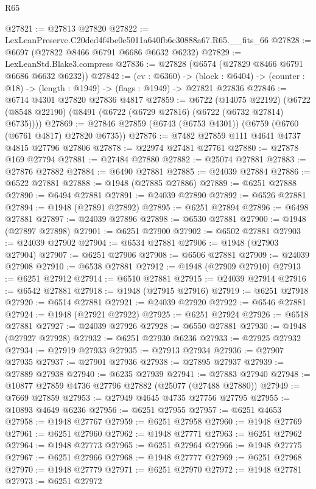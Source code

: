 \begin{lexlean}{R65}
\begin{coremodule}
{@27821 := @27813 @27820
@27822 := LexLeanPreserve.C20ded4f4be0e5011a640fb6c30888a67.R65.__fits_66
@27828 := @6697 (@27822 @8466 @6791 @6686 @6632 @6232)
@27829 := LexLeanStd.Blake3.compress
@27836 := @27828 (@6574 (@27829 @8466 @6791 @6686 @6632 @6232))
@27842 := (cv : @6360) ->
  (block : @6404) -> (counter : @18) -> (length : @1949) -> (flags : @1949) -> @27821 @27836
@27846 := @6714 @4301 @27820 @27836 @4817
@27859 := @6722
    (@14075 @22192)
    (@6722 (@8548 @22190) (@8491 (@6722 (@6729 @27816) (@6722 (@6732 @27814) @6735))))
@27869 := @27846 @27859 (@6743 (@6753 @4301)) (@6759 (@6760 (@6761 @4817) @27820 @6735))
@27876 := @7482 @27859 @111 @4641 @4737 @4815 @27796 @27806
@27878 := @22974 @27481 @27761
@27880 := @27878 @169 @27794
@27881 := @27484 @27880
@27882 := @25074 @27881
@27883 := @27876 @27882
@27884 := @6490 @27881
@27885 := @24039 @27884
@27886 := @6522 @27881
@27888 := @1948 (@27885 @27886)
@27889 := @6251 @27888
@27890 := @6494 @27881
@27891 := @24039 @27890
@27892 := @6526 @27881
@27894 := @1948 (@27891 @27892)
@27895 := @6251 @27894
@27896 := @6498 @27881
@27897 := @24039 @27896
@27898 := @6530 @27881
@27900 := @1948 (@27897 @27898)
@27901 := @6251 @27900
@27902 := @6502 @27881
@27903 := @24039 @27902
@27904 := @6534 @27881
@27906 := @1948 (@27903 @27904)
@27907 := @6251 @27906
@27908 := @6506 @27881
@27909 := @24039 @27908
@27910 := @6538 @27881
@27912 := @1948 (@27909 @27910)
@27913 := @6251 @27912
@27914 := @6510 @27881
@27915 := @24039 @27914
@27916 := @6542 @27881
@27918 := @1948 (@27915 @27916)
@27919 := @6251 @27918
@27920 := @6514 @27881
@27921 := @24039 @27920
@27922 := @6546 @27881
@27924 := @1948 (@27921 @27922)
@27925 := @6251 @27924
@27926 := @6518 @27881
@27927 := @24039 @27926
@27928 := @6550 @27881
@27930 := @1948 (@27927 @27928)
@27932 := @6251 @27930 @6236
@27933 := @27925 @27932
@27934 := @27919 @27933
@27935 := @27913 @27934
@27936 := @27907 @27935
@27937 := @27901 @27936
@27938 := @27895 @27937
@27939 := @27889 @27938
@27940 := @6235 @27939
@27941 := @27883 @27940
@27948 := @10877 @27859 @4736 @27796 @27882 (@25077 (@27488 @27880))
@27949 := @7669 @27859
@27953 := @27949 @4645 @4735 @27756 @27795
@27955 := @10893 @4649 @6236
@27956 := @6251 @27955
@27957 := @6251 @4653
@27958 := @1948 @27767
@27959 := @6251 @27958
@27960 := @1948 @27769
@27961 := @6251 @27960
@27962 := @1948 @27771
@27963 := @6251 @27962
@27964 := @1948 @27773
@27965 := @6251 @27964
@27966 := @1948 @27775
@27967 := @6251 @27966
@27968 := @1948 @27777
@27969 := @6251 @27968
@27970 := @1948 @27779
@27971 := @6251 @27970
@27972 := @1948 @27781
@27973 := @6251 @27972
}
\end{coremodule}
\end{lexlean}
